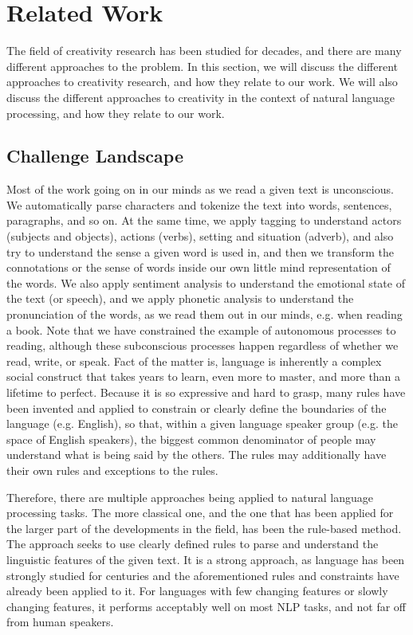\chapter{Related Work}
\label{chap:background}
The field of creativity research has been studied for decades, and there are many different approaches to the problem. In this section, we will discuss the different approaches to creativity research, and how they relate to our work. We will also discuss the different approaches to creativity in the context of natural language processing, and how they relate to our work.

\section{Challenge Landscape}
\label{sec:challenge_landscape}
Most of the work going on in our minds as we read a given text is unconscious. We automatically parse characters and tokenize the text into words, sentences, paragraphs, and so on. At the same time, we apply tagging to understand actors (subjects and objects), actions (verbs), setting and situation (adverb), and also try to understand the sense a given word is used in, and then we transform the connotations or the sense of words inside our own little mind representation of the words. We also apply sentiment analysis to understand the emotional state of the text (or speech), and we apply phonetic analysis to understand the pronunciation of the words, as we read them out in our minds, e.g. when reading a book. Note that we have constrained the example of autonomous processes to reading, although these subconscious processes happen regardless of whether we read, write, or speak. Fact of the matter is, language is inherently a complex social construct that takes years to learn, even more to master, and more than a lifetime to perfect. Because it is so expressive and hard to grasp, many rules have been invented and applied to constrain or clearly define the boundaries of the language (e.g. English), so that, within a given language speaker group (e.g. the space of English speakers), the biggest common denominator of people may understand what is being said by the others. The rules may additionally have their own rules and exceptions to the rules. 


Therefore, there are multiple approaches being applied to natural language processing tasks. The more classical one, and the one that has been applied for the larger part of the developments in the field, has been the rule-based method. The approach seeks to use clearly defined rules to parse and understand the linguistic features of the given text. It is a strong approach, as language has been strongly studied for centuries and the aforementioned rules and constraints have already been applied to it. For languages with few changing features or slowly changing features, it performs acceptably well on most NLP tasks, and not far off from human speakers. 

